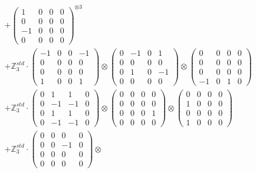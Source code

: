 \documentclass{article}
\begin{document}
{\begin{align}
        &+ \label{Rs16-Rc11-Solution-7-c16} \begin{pmatrix} 1 & 0 & 0 & 0 \\ 0 & 0 & 0 & 0 \\ -1 & 0 & 0 & 0 \\ 0 & 0 & 0 & 0 \end{pmatrix}^{\otimes 3} \\
        &+ \label{Rs16-Rc11-Solution-7-c17} \mathbb{Z}_3^{std} \cdot 
            \begin{pmatrix} -1 & 0 & 0 & -1 \\ 0 & 0 & 0 & 0 \\ 0 & 0 & 0 & 0 \\ 1 & 0 & 0 & 1 \end{pmatrix} \otimes 
            \begin{pmatrix} 0 & -1 & 0 & 1 \\ 0 & 0 & 0 & 0 \\ 0 & 1 & 0 & -1 \\ 0 & 0 & 0 & 0 \end{pmatrix} \otimes 
            \begin{pmatrix} 0 & 0 & 0 & 0 \\ 0 & 0 & 0 & 0 \\ 0 & 0 & 0 & 0 \\ -1 & 0 & 1 & 0 \end{pmatrix} \\ 
        &+ \label{Rs16-Rc11-Solution-7-c18} \mathbb{Z}_3^{std} \cdot 
            \begin{pmatrix} 0 & 1 & 1 & 0 \\ 0 & -1 & -1 & 0 \\ 0 & 1 & 1 & 0 \\ 0 & -1 & -1 & 0 \end{pmatrix} \otimes 
            \begin{pmatrix} 0 & 0 & 0 & 0 \\ 0 & 0 & 0 & 0 \\ 0 & 0 & 0 & 1 \\ 0 & 0 & 0 & 0 \end{pmatrix} \otimes 
            \begin{pmatrix} 0 & 0 & 0 & 0 \\ 1 & 0 & 0 & 0 \\ 0 & 0 & 0 & 0 \\ 1 & 0 & 0 & 0 \end{pmatrix} \\ 
        &+ \label{Rs16-Rc11-Solution-7-c19} \mathbb{Z}_3^{std} \cdot 
            \begin{pmatrix} 0 & 0 & 0 & 0 \\ 0 & 0 & -1 & 0 \\ 0 & 0 & 0 & 0 \\ 0 & 0 & 0 & 0 \end{pmatrix} \otimes 

\end{align}}
\end{document}
